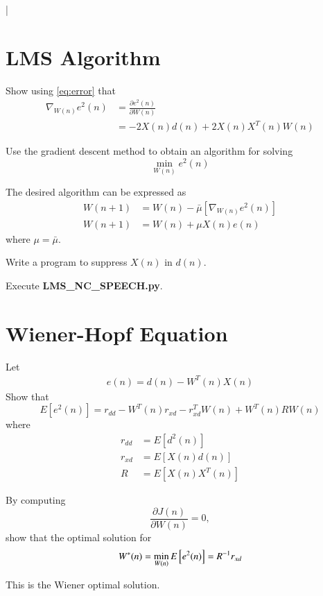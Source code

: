 |\documentclass[journal,12pt,twocolumn]{IEEEtran}
\begin{document}
\section{LMS Algorithm}
%
\begin{problem}
Show using \eqref{eq:error}  that 
\begin{align}
\nabla_{W(n)}e^2(n)&=\frac{\partial e^{2}(n)}{\partial W(n)}\\
&=- 2X(n)d(n) + 2 X(n) X^{T}(n)W(n)
\end{align}
%
\end{problem}

\begin{problem}
Use the gradient descent method to obtain an algorithm for solving
\begin{equation}
\label{eq:mse}
\min_{W(n)}e^{2}(n)
\end{equation}
%
\end{problem}
\solution The desired algorithm can be expressed as
%
\begin{align}
W(n+1)&=W(n) - \bar{\mu}[ \nabla_{W(n)}e^2(n)]
\\
W(n+1)&=W(n)+ \mu X(n) e(n)
\end{align}
%
where $\mu = \bar{\mu}$.
\begin{problem}
Write a program to suppress $X(n)$ in $d(n)$.
\end{problem}
\solution Execute \textbf{LMS\_NC\_SPEECH.py}.

\section{Wiener-Hopf Equation}
\begin{problem}
Let
%
\begin{align}
e(n) = d(n)-W^{T}(n)X(n)
\end{align}
%
Show that
\begin{equation}
E[e^{2}(n)] = r_{dd} - W^{T}(n)r_{xd} - r^{T}_{xd}W(n) + W^{T}(n) R W(n)
\end{equation}
where
\begin{align}
r_{dd} &= E[d^2(n)]
\\
r_{xd} &= E[X(n)d(n)]
\\
R &= E[X(n)X^{T}(n)]
\label{eq:matrix_R}
\end{align}
\end{problem}
%
\begin{problem}
By computing 
\begin{equation}
\frac{\partial J(n)}{\partial W(n)}=0,
\end{equation}
show that the optimal solution for
%
\begin{equation}
\label{eq:wiener_opt}
W^*(n) = \min_{W(n)}E{}\left[e^2(n)\right] = R^{-1} r_{xd}
\end{equation}
%
\end{problem}
This is the Wiener optimal solution.
\end{document}
